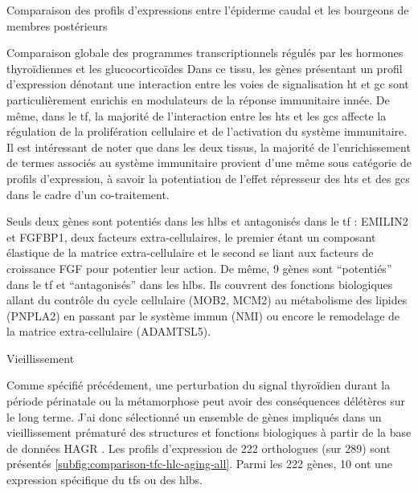 \documentclass[../main.tex]{subfiles}
\begin{document}
\begin{chapter}{Comparaison des profils d'expressions entre l'épiderme caudal et les bourgeons de membres postérieurs}
\begin{section}{Comparaison globale des programmes transcriptionnels régulés par les hormones thyroïdiennes et les glucocorticoïdes}
Dans ce tissu, les gènes présentant un profil d'expression dénotant une interaction entre les voies de signalisation \gls{ht} et \gls{gc} sont particulièrement enrichis en modulateurs de la réponse immunitaire innée.
De même, dans le \gls{tf}, la majorité de l'interaction entre les \glspl{ht} et les \glspl{gc} affecte la régulation de la prolifération cellulaire et de l'activation du système immunitaire.
Il est intéressant de noter que dans les deux tissus, la majorité de l'enrichissement de termes associés au système immunitaire provient d'une même sous catégorie de profils d'expression, à savoir la potentiation de l'effet répresseur des \glspl{ht} et des \glspl{gc} dans le cadre d'un co-traitement.
\par
Seuls deux gènes sont potentiés dans les \glspl{hlb} et antagonisés dans le \gls{tf} :
EMILIN2 et FGFBP1, deux facteurs extra-cellulaires, le premier étant un composant élastique de la matrice extra-cellulaire et le second se liant aux facteurs de croissance FGF pour potentier leur action.
De même, 9 gènes sont ``potentiés'' dans le \gls{tf} et ``antagonisés'' dans les \glspl{hlb}.
Ils couvrent des fonctions biologiques allant du contrôle du cycle cellulaire (MOB2, MCM2) au métabolisme des lipides (PNPLA2) en passant par le système immun (NMI) ou encore le remodelage de la matrice extra-cellulaire (ADAMTSL5).



\end{section}


\begin{section}{Vieillissement}

Comme spécifié précédement, une perturbation du signal thyroïdien durant la période périnatale ou la métamorphose peut avoir des conséquences délétères sur le long terme.
J'ai donc sélectionné un ensemble de gènes impliqués dans un vieillissement prématuré des structures et fonctions biologiques à partir de la base de données HAGR \citep{DeMagalhaes2005}.
Les profils d'expression de 222 orthologues (sur 289) sont présentés \autoref{subfig:comparison-tfc-hlc-aging-all}.
Parmi les 222 gènes, 10 ont une expression spécifique du \glspl{tf} ou des \glspl{hlb}.




\end{section}
\end{chapter}
\end{document}
